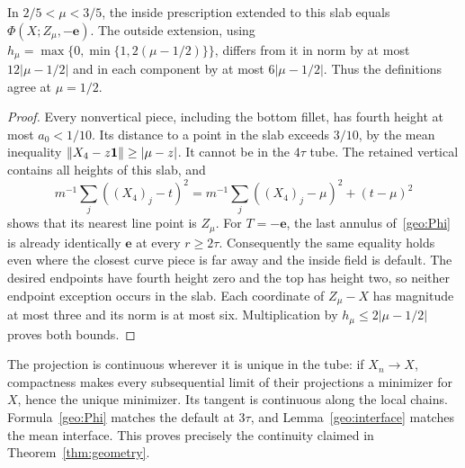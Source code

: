 \begin{lemma}\label{geo:interface}
In $2/5<\mu<3/5$, the inside prescription extended to this slab equals
$\Phi(X;Z_\mu,-\mathbf e)$. The outside extension, using
$h_\mu=\max\{0,\min\{1,2(\mu-1/2)\}\}$, differs from it in norm by
at most $12|\mu-1/2|$ and in each component by at most $6|\mu-1/2|$.
Thus the definitions agree at $\mu=1/2$.
\end{lemma}
\begin{proof}
Every nonvertical piece, including the bottom fillet, has fourth height
at most $a_0<1/10$. Its distance to a point in the slab exceeds $3/10$,
by the mean inequality $\lVert X_4-z\mathbf1\rVert\ge|\mu-z|$.
It cannot be in the $4\tau$ tube. The retained vertical contains all
heights of this slab, and
\[
 m^{-1}\sum_j((X_4)_j-t)^2
 =m^{-1}\sum_j((X_4)_j-\mu)^2+(t-\mu)^2
\]
shows that its nearest line point is $Z_\mu$. For $T=-\mathbf e$,
the last annulus of~\eqref{geo:Phi} is already identically
$\mathbf e$ at every $r\ge2\tau$. Consequently the same equality
holds even where the closest curve piece is far away and the inside
field is default. The desired endpoints have fourth height zero and
the top has height two, so neither endpoint exception occurs in the
slab. Each coordinate of $Z_\mu-X$ has magnitude at most three and
its norm is at most six. Multiplication by
$h_\mu\le2|\mu-1/2|$ proves both bounds.
\end{proof}

The projection is continuous wherever it is unique in the tube:
if $X_n\to X$, compactness makes every subsequential limit of their
projections a minimizer for $X$, hence the unique minimizer. Its tangent
is continuous along the local chains. Formula~\eqref{geo:Phi} matches
the default at $3\tau$, and Lemma~\ref{geo:interface} matches the mean
interface. This proves precisely the continuity claimed in
Theorem~\ref{thm:geometry}.

